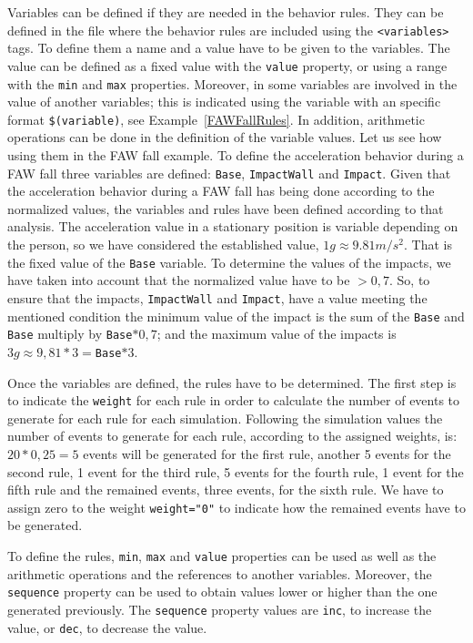 \documentclass[review]{elsarticle}
\begin{document}
Variables can be defined if they are needed in the behavior rules. They can be defined in the file where the behavior rules are included using the \texttt{<variables>} tags. To define them a name and a value 
have to be given to the variables. The value can be defined as a fixed value with the \texttt{value} property, or using a range with the \texttt{min} and \texttt{max} properties. Moreover, in some variables
are involved in the value of another variables; this is indicated using the variable with an specific format \texttt{\$(variable)}, see Example~\ref{FAWFallRules}. In addition, arithmetic operations can be done in the definition of the variable values. Let us see how using them in the FAW fall example. To define the acceleration behavior during a FAW fall three variables are defined: \texttt{Base}, 
\texttt{ImpactWall} and \texttt{Impact}. Given that the acceleration behavior during a FAW fall has being done according to the normalized values, the variables and rules have been defined according to that analysis. The acceleration value in a stationary position is variable depending on the person, so we have considered the established value, $1g\approx9.81m/s^{2}$. That is the fixed value of the \texttt{Base} variable. To determine the values of the impacts, we have taken into account that the 
normalized value have to be $> 0,7$. So, to ensure that the impacts, \texttt{ImpactWall} and \texttt{Impact}, have a value meeting the mentioned condition the minimum value of the impact is the sum of the \texttt{Base} and \texttt{Base} multiply by \texttt{Base}$*0,7$; and the maximum value of the impacts is $3g\approx9,81*3=$\texttt{Base}$*3$.

Once the variables are defined, the rules have to be determined. The first step is to indicate the \texttt{weight} for each rule in order to calculate the number of events to generate for each rule for each simulation. Following the simulation values the number of events to generate for each rule, according to the assigned weights, is: $20 * 0,25 = 5$ events will be generated for the first rule, another 5 events 
for the second rule, 1 event for the third rule, 5 events for the fourth rule, 1 event for the fifth rule and the remained events, three events, for the sixth rule. We have to assign zero to the weight \texttt{weight="0"} to indicate how the remained events have to be generated.

To define the rules, \texttt{min}, \texttt{max} and \texttt{value} properties can be used as well as the arithmetic operations and the references to another variables. Moreover, the \texttt{sequence} property can be used to obtain values lower or higher than the one generated previously. The \texttt{sequence} property values are \texttt{inc}, to increase the value, or \texttt{dec}, to decrease the value. 
\end{document}
